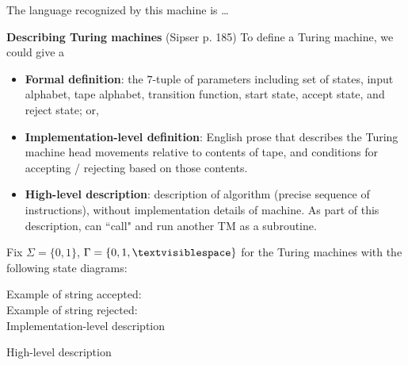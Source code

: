 \documentclass[12pt, oneside]{article}
\begin{document}
The language recognized by this machine is \ldots

\vfill
 

{\bf Describing  Turing machines} (Sipser p. 185) To define a Turing machine, we could give a 
\begin{itemize}
\item {\bf Formal definition}: the $7$-tuple of parameters including set of states, 
input alphabet, tape alphabet, transition function, start state, accept state, and reject state; or,
\item {\bf Implementation-level definition}: English prose that describes the Turing machine head 
movements relative to contents of tape, and conditions for accepting / rejecting based on those contents.
\item {\bf High-level description}: description of algorithm (precise sequence of instructions), 
without implementation details of machine. As part of this description, can ``call" and run 
another TM as a subroutine.
\end{itemize}
  
\newpage
Fix $\Sigma = \{0,1\}$, $\Gamma = \{ 0, 1, \textvisiblespace\}$ for the Turing machines with  the following state diagrams:
  
\begin{center}
\end{center}

Example of string accepted: \\
Example of string rejected: \\


Implementation-level description

\vfill

High-level description

\vfill

\begin{center}
\end{center}
\end{document}
